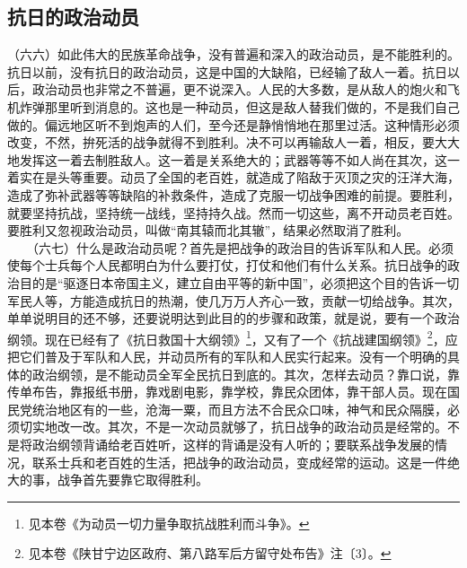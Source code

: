 \documentclass[cn,11pt,chinese]{elegantbook}
\def\myformat#1{\hfil\hfil #1}
\begin{document}
\subsection*{\myformat{抗日的政治动员}}
（六六）如此伟大的民族革命战争，没有普遍和深入的政治动员，是不能胜利的。抗日以前，没有抗日的政治动员，这是中国的大缺陷，已经输了敌人一着。抗日以后，政治动员也非常之不普遍，更不说深入。人民的大多数，是从敌人的炮火和飞机炸弹那里听到消息的。这也是一种动员，但这是敌人替我们做的，不是我们自己做的。偏远地区听不到炮声的人们，至今还是静悄悄地在那里过活。这种情形必须改变，不然，拚死活的战争就得不到胜利。决不可以再输敌人一着，相反，要大大地发挥这一着去制胜敌人。这一着是关系绝大的；武器等等不如人尚在其次，这一着实在是头等重要。动员了全国的老百姓，就造成了陷敌于灭顶之灾的汪洋大海，造成了弥补武器等等缺陷的补救条件，造成了克服一切战争困难的前提。要胜利，就要坚持抗战，坚持统一战线，坚持持久战。然而一切这些，离不开动员老百姓。要胜利又忽视政治动员，叫做“南其辕而北其辙”，结果必然取消了胜利。\\
　　（六七）什么是政治动员呢？首先是把战争的政治目的告诉军队和人民。必须使每个士兵每个人民都明白为什么要打仗，打仗和他们有什么关系。抗日战争的政治目的是“驱逐日本帝国主义，建立自由平等的新中国”，必须把这个目的告诉一切军民人等，方能造成抗日的热潮，使几万万人齐心一致，贡献一切给战争。其次，单单说明目的还不够，还要说明达到此目的的步骤和政策，就是说，要有一个政治纲领。现在已经有了《抗日救国十大纲领》\footnote[22]{ 见本卷《为动员一切力量争取抗战胜利而斗争》。}，又有了一个《抗战建国纲领》\footnote[23]{ 见本卷《陕甘宁边区政府、第八路军后方留守处布告》注〔3〕。}，应把它们普及于军队和人民，并动员所有的军队和人民实行起来。没有一个明确的具体的政治纲领，是不能动员全军全民抗日到底的。其次，怎样去动员？靠口说，靠传单布告，靠报纸书册，靠戏剧电影，靠学校，靠民众团体，靠干部人员。现在国民党统治地区有的一些，沧海一粟，而且方法不合民众口味，神气和民众隔膜，必须切实地改一改。其次，不是一次动员就够了，抗日战争的政治动员是经常的。不是将政治纲领背诵给老百姓听，这样的背诵是没有人听的；要联系战争发展的情况，联系士兵和老百姓的生活，把战争的政治动员，变成经常的运动。这是一件绝大的事，战争首先要靠它取得胜利。\\
\end{document}
